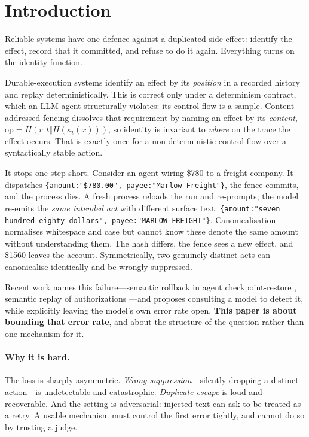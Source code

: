 \documentclass[10pt,twocolumn]{article}
\theoremstyle{definition}
\theoremstyle{remark}
\begin{document}
\section{Introduction}

Reliable systems have one defence against a duplicated side effect: identify the
effect, record that it committed, and refuse to do it again. Everything turns on
the identity function.

Durable-execution systems identify an effect by its \emph{position} in a
recorded history and replay deterministically. This is correct only under a
determinism contract, which an LLM agent structurally violates: its control flow
is a sample. Content-addressed fencing dissolves that requirement by naming an
effect by its \emph{content}, $\mathrm{op}=H(r \Vert t \Vert H(\kappa_t(x)))$,
so identity is invariant to \emph{where} on the trace the effect occurs. That is
exactly-once for a non-deterministic control flow over a syntactically stable
action.

It stops one step short. Consider an agent wiring \$780 to a freight company.
It dispatches \texttt{\{amount:"\$780.00", payee:"Marlow Freight"\}}, the fence
commits, and the process dies. A fresh process reloads the run and re-prompts;
the model re-emits the \emph{same intended act} with different surface text:
\texttt{\{amount:"seven hundred eighty dollars", payee:"MARLOW FREIGHT"\}}.
Canonicalisation normalises whitespace and case but cannot know these denote the
same amount without understanding them. The hash differs, the fence sees a new
effect, and \$1560 leaves the account. Symmetrically, two genuinely distinct
acts can canonicalise identically and be wrongly suppressed.

Recent work names this failure---semantic rollback in agent checkpoint-restore
\cite{ref14}, semantic replay of authorizations \cite{ref15}---and proposes
consulting a model to detect it, while explicitly leaving the model's own error
rate open. \textbf{This paper is about bounding that error rate}, and about the
structure of the question rather than one mechanism for it.

\paragraph{Why it is hard.} The loss is sharply asymmetric.
\emph{Wrong-suppression}---silently dropping a distinct action---is
undetectable and catastrophic. \emph{Duplicate-escape} is loud and recoverable.
And the setting is adversarial: injected text can ask to be treated as a retry.
A usable mechanism must control the first error tightly, and cannot do so by
trusting a judge.
\end{document}
